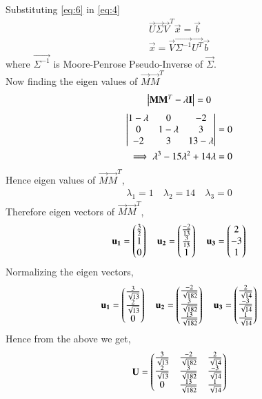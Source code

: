 \documentclass[journal,12pt,twocolumn]{IEEEtran}
\begin{document}
Substituting \eqref{eq:6} in \eqref{eq:4}
\begin{align}
\vec{U}\vec{\Sigma}\vec{V}^T\vec{x} = \vec{b}\\
\vec{x} = \vec{V}\vec{\Sigma^{-1}}\vec{U^T}\vec{b}\label{eq:8}
\end{align}
where $\vec{\Sigma^{-1}}$ is Moore-Penrose Pseudo-Inverse of $\vec{\Sigma}$.\\ Now finding the eigen values of $\vec{M}\vec{M}^T$
\begin{align}
\begin{vmatrix}\mathbf{M}\mathbf{M}^T - \lambda\mathbf{I}\end{vmatrix} = 0
\end{align}
\begin{align}
\begin{vmatrix}1-\lambda&0&-2\\0&1-\lambda&3\\-2&3&13-\lambda\end{vmatrix}=0\\
\implies \lambda^3-15\lambda^2+14\lambda=0
\end{align}
Hence eigen values of $\vec{M}\vec{M}^T$,
\begin{align}
\lambda_1 = 1 \quad \lambda_2 =14 \quad \lambda_3=0
\end{align}
Therefore eigen vectors of $\vec{M}\vec{M}^T$,
\begin{align}
\mathbf{u_1}=\begin{pmatrix}\frac{3}{2}\\1\\0\end{pmatrix} \quad
\mathbf{u_2}=\begin{pmatrix}\frac{-2}{13}\\\frac{3}{13}\\1\end{pmatrix} \quad
\mathbf{u_3}=\begin{pmatrix}2\\-3\\1\end{pmatrix}
\end{align}
Normalizing the eigen vectors,
\begin{align}
\mathbf{u_1}=\begin{pmatrix}\frac{3}{\sqrt{13}}\\\frac{2}{\sqrt{13}}\\0\end{pmatrix}\quad
\mathbf{u_2}=\begin{pmatrix}\frac{-2}{\sqrt{182}}\\\frac{3}{\sqrt{182}}\\\frac{13}{\sqrt{182}}\end{pmatrix}\quad
\mathbf{u_3}=\begin{pmatrix}\frac{2}{\sqrt{14}}\\\frac{-3}{\sqrt{14}}\\\frac{1}{\sqrt{14}}\end{pmatrix}
\end{align}
Hence from the above we get,
\begin{align}
\mathbf{U}=\begin{pmatrix}\frac{3}{\sqrt{13}}&\frac{-2}{\sqrt{182}}&\frac{2}{\sqrt{14}}\\\frac{2}{\sqrt{13}}&\frac{3}{\sqrt{182}}&\frac{-3}{\sqrt{14}}\\0&\frac{13}{\sqrt{182}}&\frac{1}{\sqrt{14}}\end{pmatrix}\label{eq:9}
\end{align}
\end{document}
